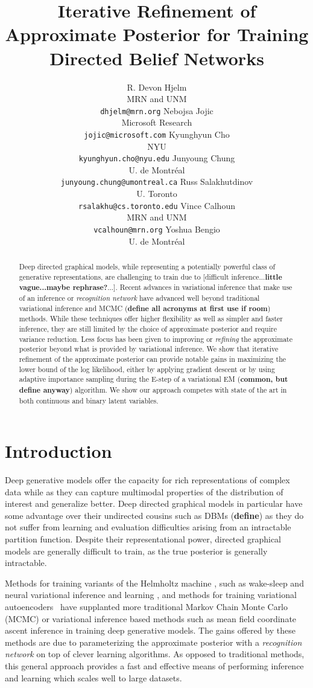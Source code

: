 \documentclass{article} %
\title{Iterative Refinement of Approximate Posterior for Training Directed Belief Networks}
\author{R. Devon Hjelm \\
MRN and UNM \\
\texttt{dhjelm@mrn.org} 
\And
Nebojsa Jojic \\
Microsoft Research \\
\texttt{jojic@microsoft.com}
\And
Kyunghyun Cho \\
NYU \\
\texttt{kyunghyun.cho@nyu.edu}
\And
Junyoung Chung \\
U. de Montr\'{e}al \\
\texttt{junyoung.chung@umontreal.ca}
\And
Russ Salakhutdinov \\
U. Toronto \\
\texttt{rsalakhu@cs.toronto.edu}
\And
Vince Calhoun \\
MRN and UNM \\
\texttt{vcalhoun@mrn.org}
\And
Yoshua Bengio \\
U. de Montr\'{e}al
}
\begin{document}
\maketitle

\begin{abstract}
    Deep directed graphical models, while representing a potentially powerful
    class of generative representations, are challenging to train due to
    [difficult inference...\textbf{little vague...maybe rephrase?}...]. Recent advances in variational inference that make use
    of an inference or \emph{recognition network} have advanced well beyond
    traditional variational inference and MCMC (\textbf{define all acronyms at first use if room}) methods. While these techniques
    offer higher flexibility as well as simpler and faster inference, they are
    still limited by the choice of approximate posterior and require variance
    reduction. Less focus has been given to improving or \emph{refining} the
    approximate posterior beyond what is provided by variational inference. We
    show that iterative refinement of the approximate posterior can provide
    notable gains in maximizing the lower bound of the log likelihood, either
    by applying gradient descent or by using adaptive importance sampling
    during the E-step of a variational EM (\textbf{common, but define anyway}) algorithm. We show our approach
    competes with state of the art in both continuous and binary latent
    variables.
    \end{abstract}

\section{Introduction}

Deep generative models offer the capacity for rich representations of complex
data while as they can capture multimodal properties of the distribution of
interest and generalize better. Deep directed
graphical models in particular have some advantage over their undirected
cousins such as DBMs (\textbf{define}) \citep{salakhutdinov2009deep} as they do not suffer from
learning and evaluation difficulties arising from an intractable partition
function. Despite their representational power, directed graphical models are
generally difficult to train, as the true posterior is generally intractable.

Methods for training variants of the Helmholtz machine
\citep{dayan1995helmholtz}, such as wake-sleep \citep{hinton1995wake,
bornschein2014reweighted} and neural variational inference and learning
\citep[NVIL,][]{mnih2014neural}, and methods for training variational autoencoders~
\citep[VAE,][]{kingma2013auto} have supplanted more traditional Markov Chain Monte
Carlo (MCMC) or variational inference based methods such as mean field
coordinate ascent inference in training deep generative models. The gains
offered by these methods are due to parameterizing the approximate posterior
with a \emph{recognition network} on top of clever learning algorithms. As
opposed to traditional methods, this general approach provides a fast and
effective means of performing inference and learning which scales well to large
datasets.
\end{document}
